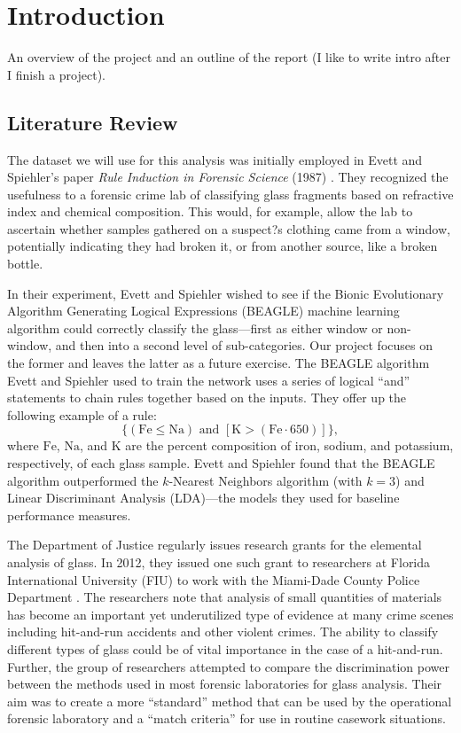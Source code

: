 \documentclass[12pt,halfline,a4paper]{ouparticle}
\begin{document}
\section{Introduction}
\label{sec2}
An overview of the project and an outline of the report (I like to write intro after I finish a project).

\subsection{Literature Review}
\label{sec2.1}
The dataset we will use for this analysis was initially employed in Evett and Spiehler's paper \emph{Rule Induction in Forensic Science} (1987) \cite{evett1987}. They recognized the usefulness to a forensic crime lab of classifying glass fragments based on refractive index and chemical composition. This would, for example, allow the lab to ascertain whether samples gathered on a suspect?s clothing came from a window, potentially indicating they had broken it, or from another source, like a broken bottle. 

In their experiment, Evett and Spiehler wished to see if the Bionic Evolutionary Algorithm Generating Logical Expressions (BEAGLE) machine learning algorithm could correctly classify the glass---first as either window or non-window, and then into a second level of sub-categories. Our project focuses on the former and leaves the latter as a future exercise. The BEAGLE algorithm Evett and Spiehler used to train the network uses a series of logical ``and'' statements to chain rules together based on the inputs. They offer up the following example of a rule: 
\begin{equation}
\{(\mathrm{Fe} \leq \mathrm{Na}) \text{ and } [\mathrm{K} > (\mathrm{Fe} \cdot 650)]\}, 
\end{equation}
where $\mathrm{Fe}$, $\mathrm{Na}$, and $\mathrm{K}$ are the percent composition of iron, sodium, and potassium, respectively, of each glass sample. Evett and Spiehler found that the BEAGLE algorithm outperformed the $k$-Nearest Neighbors algorithm (with $ k = 3$) and Linear Discriminant Analysis (LDA)---the models they used for baseline performance measures. 

The Department of Justice regularly issues research grants for the elemental analysis of glass. In 2012, they issued one such grant to researchers at Florida International University (FIU) to work with the Miami-Dade County Police Department \cite{almirall2012}. The researchers note that analysis of small quantities of materials has become an important yet underutilized type of evidence at many crime scenes including hit-and-run accidents and other violent crimes. The ability to classify different types of glass could be of vital importance in the case of a hit-and-run. Further, the group of researchers attempted to compare the discrimination power between the methods used in most forensic laboratories for glass analysis. Their aim was to create a more ``standard'' method that can be used by the operational forensic laboratory and a ``match criteria'' for use in routine casework situations.
\end{document}
